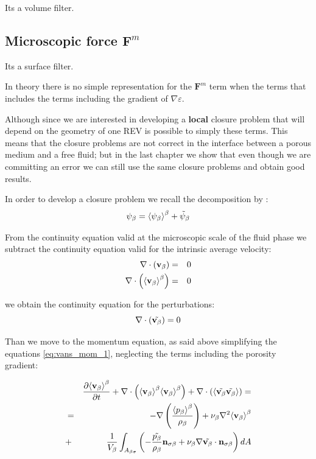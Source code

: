 Its a volume filter.

\subsection{Microscopic force $\mathbf{F}^m$}
Its a surface filter.

In theory there is no simple representation for the $\mathbf{F}^m$ term when the terms that includes the terms including the gradient of $\nabla \varepsilon$.

Although since we are interested in developing a \textbf{local} closure problem that will depend on the geometry of one REV is possible to simply these terms.
This means that the closure problems are not correct in the interface between a porous medium and a free fluid; but in the last chapter we show that even though we are committing an error we can still use the same closure problems and obtain good results.

In order to develop a closure problem we recall the decomposition by \citet{gray1975derivation}:
\begin{equation}
\psi_{\beta} = {\left< \psi_{\beta} \right>}^{\beta} + \tilde{\psi}_{\beta}
\end{equation}

From the continuity equation valid at the microscopic scale of the fluid phase we subtract the continuity equation valid for the intrinsic average velocity:
\begin{eqnarray}
\nabla \cdot \left( \textbf{v}_{\beta} \right) &=& 0 \nonumber \\
\nabla \cdot \left( {\left< \textbf{v}_{\beta} \right>}^{\beta} \right) &=& 0 \nonumber \\
\end{eqnarray}

we obtain the continuity equation for the perturbations:
$$
\nabla \cdot \left( \tilde{\textbf{v}_{\beta}} \right) = 0 
$$

Than we move to the momentum equation, as said above simplifying the equations \eqref{eq:vans_mom_1}, neglecting the terms including the porosity gradient:

\begin{eqnarray}
& &  \frac{\partial {\left< \textbf{v}_{\beta}\right>}^{\beta}}{\partial t} + \nabla \cdot \left({\left< \textbf{v}_{\beta} \right>}^{\beta}{\left< \textbf{v}_{\beta} \right>}^{\beta}\right)   + \nabla \cdot \left({\left< \tilde{\textbf{v}_{\beta}} \tilde{\textbf{v}_{\beta}} \right>}\right) = \nonumber \\
&=& -\nabla \left(\dfrac{{\left< p_{\beta} \right>}^{\beta}}{\rho_{\beta}}\right) + \nu_{\beta} \nabla^2 {\left< \textbf{v}_{\beta} \right>}^{\beta}  \nonumber \\
&+& \dfrac{1}{V_\beta} \int_{A_{\beta \sigma}} \left(-\dfrac{\tilde{p_{\beta}}}{\rho_{\beta}} \mathbf{n}_{\sigma \beta}  + \nu_{\beta} \nabla \tilde{\textbf{v}_{\beta}} \cdot \mathbf{n}_{\sigma \beta}\right) dA
\label{eq:vans_mom_2}
\end{eqnarray}

